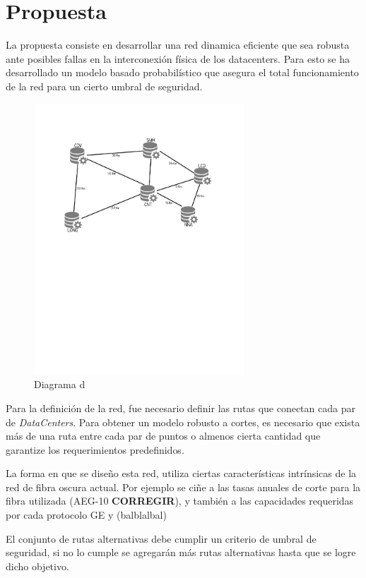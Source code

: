 \section{Propuesta}
\label{sec:propuesta}

La propuesta consiste en desarrollar una red dinamica eficiente que
sea robusta ante posibles fallas en la interconexión física de los
datacenters. Para esto se ha desarrollado un modelo basado
probabilístico que asegura el total funcionamiento de la red para un
cierto umbral de seguridad.

\begin{figure}[h]
\centering
\includegraphics[width=0.7\textwidth]{Imagenes/datacenters.pdf}
\caption{Diagrama d}
\end{figure}

Para la definición de la red, fue necesario definir las rutas que
conectan cada par de \textit{DataCenters}.  Para obtener un modelo
robusto a cortes, es necesario que exista más de una ruta entre cada
par de puntos o almenos cierta cantidad que garantize los
requerimientos predefinidos.

La forma en que se diseño esta red, utiliza ciertas características
intrínsicas de la red de fibra oscura actual. Por ejemplo se ciñe a
las tasas anuales de corte para la fibra utilizada (AEG-10
\textbf{CORREGIR}), y también a las capacidades requeridas por cada
protocolo GE y (balblalbal)


El conjunto de rutas alternativas debe cumplir un criterio de umbral
de seguridad, si no lo cumple se agregarán más rutas alternativas
hasta que se logre dicho objetivo.
